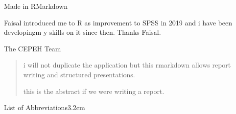 \documentclass[a4paper, nobind]{templates/ociamthesis}
\begin{document}
\begin{romanpages}

\maketitle

\begin{dedication}
  Made in RMarkdown
\end{dedication}



\begin{acknowledgements}
 	Faisal introduced me to R as improvement to SPSS in 2019 and i have been developingm y skills on it since then. Thanks Faisal.

 \begin{flushright}
 The CEPEH Team \\
 \end{flushright}
\end{acknowledgements}





\renewcommand{\abstracttitle}{Abstract}
\begin{abstract}
	i will not duplicate the application but this rmarkdown allows report writing and structured presentations.

this is the abstract if we were writing a report.
\end{abstract}



\dominitoc %

\flushbottom

\tableofcontents

\listoffigures
	\mtcaddchapter

\listoftables
  \mtcaddchapter
\begin{mclistof}{List of Abbreviations}{3.2cm}


\end{mclistof}
\end{romanpages}
\end{document}
